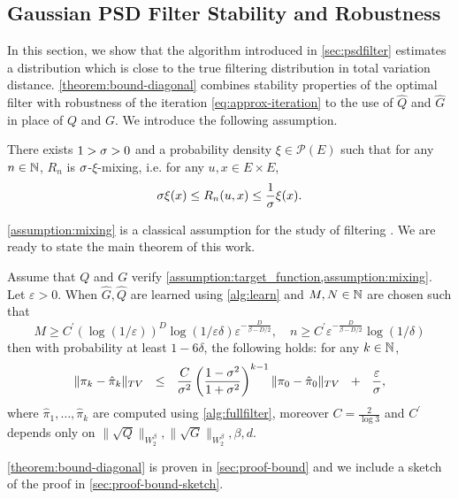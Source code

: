 \subsection{Gaussian PSD Filter Stability and Robustness}\label{sec:theory}
In this section, we show that the algorithm introduced in \cref{sec:psdfilter} estimates a distribution which is close to the true filtering distribution in total variation distance. \cref{theorem:bound-diagonal} combines stability properties of the optimal filter with robustness of the iteration \cref{eq:approx-iteration} to the use of $\hat Q$ and $\hat G$ in place of $Q$ and $G$. We introduce the following assumption.

\begin{assumption}[$R_n$ is mixing]\label{assumption:mixing}
    There exists $1 >\sigma > 0$ and a probability density $\xi\in\mathcal P(E)$ such that for any $n \in\mathbb N$, $R_n$ is $\sigma$-$\xi$-mixing, i.e. for any $u, x \in E \times E$,
    \begin{align}
        \sigma \xi(x) \leq R_n(u, x) \leq \frac{1}{\sigma}\xi(x).
    \end{align}
\end{assumption}
\cref{assumption:mixing} is a classical assumption for the study of filtering \citep{cappehmm}. We are ready to state the main theorem of this work.

\begin{theorem}\label{theorem:bound-diagonal}
Assume that $Q$ and $G$ verify \cref{assumption:target_function,assumption:mixing}. Let $\varepsilon > 0$.
When $\hat{G}, \hat{Q}$ are learned using \cref{alg:learn} and $M, N \in \mathbb N$ are chosen such that
%
$$M \geq C^\prime(\log\left(1/\varepsilon\right))^D\log\left(1/\varepsilon\delta\right)\varepsilon^{-\frac{D}{\beta - D/2}}, \quad n \geq C^\prime \varepsilon^{-\frac{D}{\beta - D/2}}\log (1/\delta)$$
%
then with probability at least $1-6\delta$, the following holds: for any $k \in \mathbb N$,
\begin{align}
    \Vert \pi_k - \hat\pi_k\Vert_{TV} ~~\leq~~ \frac{C}{\sigma^2}\left(\frac{1-\sigma^2}{1 + \sigma^2}\right)^{k-1}\|\pi_0 - \hat{\pi}_0\|_{TV} ~~+~~ \frac{\varepsilon}{\sigma},
\end{align}
where $\hat{\pi}_1,\dots, \hat{\pi}_k$ are computed using \cref{alg:fullfilter}, moreover $C=\frac{2}{\log 3}$ and $C^\prime$ depends only on $\|\sqrt{Q}\|_{W^\beta_2}, \|\sqrt{G}\|_{W^\beta_2}, \beta, d$.
\end{theorem}
\cref{theorem:bound-diagonal} is proven in \cref{sec:proof-bound} and we include a sketch of the proof in \cref{sec:proof-bound-sketch}.


